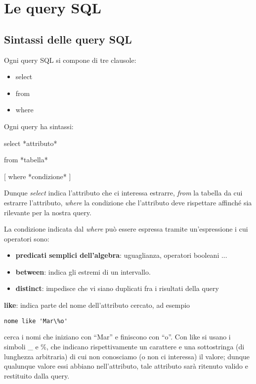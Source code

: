 \documentclass[\main/main.tex]{subfiles}
\begin{document}
\chapter{Le query SQL}

\section{Sintassi delle query SQL}
Ogni query SQL si compone di tre clausole:
\begin{itemize}
  \item select
  \item from
  \item where
\end{itemize}

Ogni query ha sintassi:

select *attributo*

from *tabella*

  [ where *condizione* ]


Dunque \textit{select} indica l'attributo che ci interessa estrarre, \textit{from} la tabella da cui estrarre l'attributo, \textit{where} la condizione che l'attributo deve rispettare affinché sia rilevante per la nostra query.

La condizione indicata dal \textit{where} può essere espressa tramite un'espressione i cui operatori sono:
\begin{itemize}
  \item \textbf{predicati semplici dell'algebra}: uguaglianza, operatori booleani ...
  \item \textbf{between}: indica gli estremi di un intervallo.
  \item \textbf{distinct}: impedisce che vi siano duplicati fra i risultati della query
\end{itemize}

\textbf{like}: indica parte del nome dell'attributo cercato, ad esempio
\begin{verbatim}
nome like 'Mar\%o'
\end{verbatim}
cerca i nomi che iniziano con ``Mar'' e finiscono con ``o''. Con like si usano i simboli \_ e \%, che indicano rispettivamente un carattere e una sottostringa (di lunghezza arbitraria) di cui non conosciamo (o non ci interessa) il valore; dunque qualunque valore essi abbiano nell'attributo, tale attributo sarà ritenuto valido e restituito dalla query.
\end{document}
